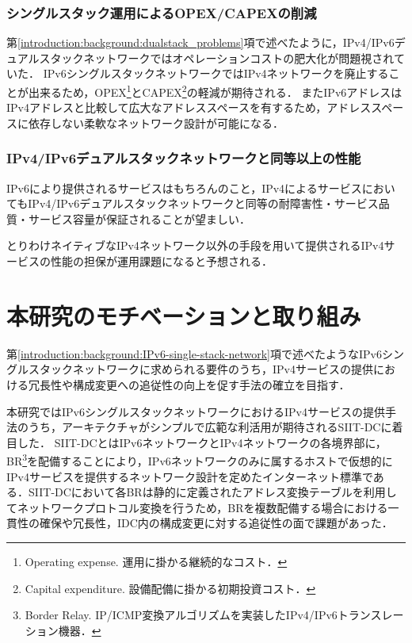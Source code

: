 \subsubsection{シングルスタック運用によるOPEX/CAPEXの削減}
第\ref{introduction:background:dualstack_problems}項で述べたように，IPv4/IPv6デュアルスタックネットワークではオペレーションコストの肥大化が問題視されていた．
IPv6シングルスタックネットワークではIPv4ネットワークを廃止することが出来るため，OPEX\footnote{Operating expense. 運用に掛かる継続的なコスト．}とCAPEX\footnote{Capital expenditure. 設備配備に掛かる初期投資コスト．}の軽減が期待される．
またIPv6アドレスはIPv4アドレスと比較して広大なアドレススペースを有するため，アドレススペースに依存しない柔軟なネットワーク設計が可能になる．

\subsubsection{IPv4/IPv6デュアルスタックネットワークと同等以上の性能}
IPv6により提供されるサービスはもちろんのこと，IPv4によるサービスにおいてもIPv4/IPv6デュアルスタックネットワークと同等の耐障害性・サービス品質・サービス容量が保証されることが望ましい．

とりわけネイティブなIPv4ネットワーク以外の手段を用いて提供されるIPv4サービスの性能の担保が運用課題になると予想される．




\section{本研究のモチベーションと取り組み}

第\ref{introduction:background:IPv6-single-stack-network}項で述べたようなIPv6シングルスタックネットワークに求められる要件のうち，IPv4サービスの提供における冗長性や構成変更への追従性の向上を促す手法の確立を目指す．

本研究ではIPv6シングルスタックネットワークにおけるIPv4サービスの提供手法のうち，アーキテクチャがシンプルで広範な利活用が期待されるSIIT-DC\cite{RFC7755}に着目した．
SIIT-DCとはIPv6ネットワークとIPv4ネットワークの各境界部に，BR\footnote{Border Relay. IP/ICMP変換アルゴリズム\cite{RFC7915}を実装したIPv4/IPv6トランスレーション機器．}を配備することにより，IPv6ネットワークのみに属するホストで仮想的にIPv4サービスを提供するネットワーク設計を定めたインターネット標準である．SIIT-DCにおいて各BRは静的に定義されたアドレス変換テーブルを利用してネットワークプロトコル変換を行うため，BRを複数配備する場合における一貫性の確保や冗長性，IDC内の構成変更に対する追従性の面で課題があった．

